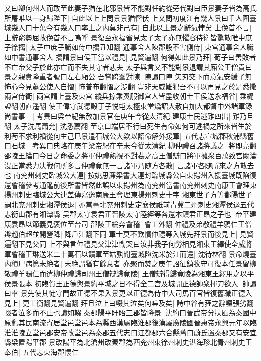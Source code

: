 又曰卿何州人而敢至此妻子猶在北邪景皆不能對任約從旁代對曰臣景妻子皆為高氏所屠唯以一身歸陛下|{
	自此以上上問景景猶慴伏}
上又問初度江有幾人景曰千人圍臺城幾人曰十萬今有幾人曰率土之内莫非己有|{
	自此以上景之辭氣悖矣}
上俛首不言|{
	上辭窮勢屈故俛首不言嗚呼}
景復至永福省見太子太子亦無懼容侍衛皆驚散唯中庶子徐摛|{
	太子中庶子職如侍中摛丑知翻}
通事舍人陳郡殷不害側侍|{
	東宫通事舍人職如中書通事舍人}
摛謂景曰侯王當以禮見|{
	見賢遍翻}
何得如此景乃拜|{
	荀子曰善敗者不亡帝父子於此亦亡而不失其守者悲夫}
太子與言又不能對景退謂其廂公王僧貴曰|{
	景之親貴隆重者號曰左右廂公}
吾嘗跨鞌對陳|{
	陳讀曰陣}
矢刃交下而意氣安緩了無怖心今見蕭公使人自慴|{
	怖普布翻慴之涉翻}
豈非天威難犯吾不可以再見之於是悉撒兩宫侍衛|{
	兩宫謂上臺及東宫}
縱兵掠乘輿服御宫人皆盡收朝士王侯送永福省|{
	乘繩證翻朝直遥翻}
使王偉守武德殿于子悦屯太極東堂矯詔大赦自加大都督中外諸軍録尚書事　|{
	考異曰梁帝紀無赦加景官在庚午今從太清紀}
建康士民逃難四出|{
	難乃旦翻}
太子洗馬蕭允|{
	洗悉薦翻}
至京口端居不行曰死生有命如何可逃禍之所來皆生於利苟不求利禍從何生己巳景遣石城公大欵以詔命解外援軍|{
	五代志宣城郡秋浦縣舊曰石城　考異曰典略在庚午梁帝紀在辛未今從太清紀}
柳仲禮召諸將議之|{
	將即亮翻}
邵陵王綸曰今日之命委之將軍仲禮熟視不對裴之高王僧辯曰將軍擁衆百萬致宫闕淪沒正當悉力决戰何所多言仲禮竟無一言諸軍乃随方各散|{
	言諸軍各随所來之方散去也}
南兖州刺史臨城公大連|{
	按姚思亷梁書大連封臨城縣公自東揚州入援臺城既陷復還會稽參考通鑑前後所書皆然此誤以東揚州為南兖州當書南兖州刺史南康王會理東揚州刺史臨城公大連盖傳寫逸南康王會理東揚州刺史十字}
湘東世子方等鄱陽世子嗣北兖州刺史湘潭侯退|{
	亦當書北兖州刺史定襄侯祇前青冀二州刺史湘潭侯退五代志衡山郡有湘潭縣}
吴郡太守袁君正晉陵太守陸經等各還本鎮君正昂之子也|{
	帝平建康袁昂以節義見褒位至台司}
邵陵王綸奔會稽|{
	會工外翻}
仲禮及弟敬禮羊鴉仁王僧辯趙伯超並開營降|{
	降戶江翻下同}
軍士莫不歎憤仲禮等入城先拜景而後見上|{
	見賢遍翻下見父同}
上不與言仲禮見父津津慟哭曰汝非我子何勞相見湘東王繹使全威將軍會稽王琳送米二十萬石以饋軍至姑孰聞臺城陷沈米於江而還|{
	沈待林翻}
景命燒臺内積尸病篤未絶者|{
	未絶謂猶有餘息者}
亦聚而焚之庚午詔征鎮牧守可復本任景留柳敬禮羊鴉仁而遣柳仲禮歸司州王僧辯歸竟陵|{
	王僧辯得歸竟陵為湘東王繹用之以平侯景張本}
初臨賀王正德與景約平城之日不得全二宫及城開正德帥衆揮刀欲入|{
	帥讀曰率}
景先使其徒守門故正德不果入景更以正德為侍中大司馬百官皆復舊職正德入見上|{
	更工衡翻見賢遍翻}
拜且泣上曰啜其泣矣何嗟及矣|{
	詩中谷有蓷之辭啜張劣翻啜者泣多而不止也讀如輟}
秦郡陽平盱眙三郡皆降景|{
	沈約曰晉武帝分扶風為秦國中原亂其民南流寄居堂邑堂邑本為縣西漢屬臨淮郡後漢屬廣陵國晉惠帝永興元年以臨淮淮陵立堂邑郡安帝改堂邑為秦郡五代志曰江都郡六合縣舊曰蔚氏置秦郡又有安宜縣梁置陽平郡}
景改陽平為北滄州改秦郡為西兖州東徐州刺史湛海珍北青州刺史王奉伯|{
	五代志東海郡懷仁}


